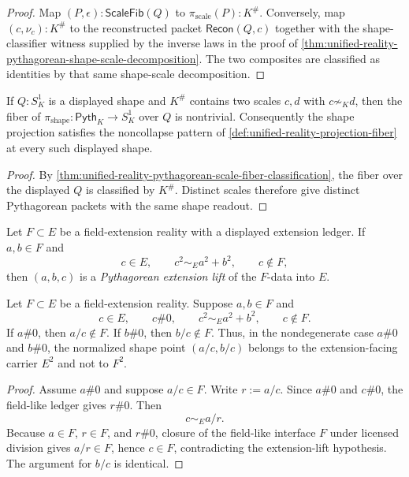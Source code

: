 \begin{proof}
Map $(P,\epsilon):\mathsf{ScaleFib}(Q)$ to
$\pi_{\mathrm{scale}}(P):K^\#$. Conversely, map $(c,\nu_c):K^\#$ to
the reconstructed packet $\mathsf{Recon}(Q,c)$ together with the
shape-classifier witness supplied by the inverse laws in the proof of
\autoref{thm:unified-reality-pythagorean-shape-scale-decomposition}.
The two composites are classified as identities by that same
shape-scale decomposition.
\end{proof}

\begin{corollary}
\label{cor:unified-reality-pythagorean-shape-projection-lossy}
If $Q:S^1_K$ is a displayed shape and $K^\#$ contains two scales $c,d$
with $c\not\sim_K d$, then the fiber of
$\pi_{\mathrm{shape}}:\mathsf{Pyth}_K\to S^1_K$ over $Q$ is
nontrivial. Consequently the shape projection satisfies the noncollapse
pattern of \autoref{def:unified-reality-projection-fiber} at every such
displayed shape.
\end{corollary}

\begin{proof}
By \autoref{thm:unified-reality-pythagorean-scale-fiber-classification},
the fiber over the displayed $Q$ is classified by $K^\#$. Distinct
scales therefore give distinct Pythagorean packets with the same shape
readout.
\end{proof}

\begin{definition}
\label{def:unified-reality-pythagorean-extension-lift}
Let $F\subset E$ be a field-extension reality with a displayed
extension ledger. If $a,b\in F$ and
$$
c\in E,\qquad c^2\sim_Ea^2+b^2,\qquad c\notin F,
$$
then $(a,b,c)$ is a \emph{Pythagorean extension lift} of the
$F$-data into $E$.
\end{definition}

\begin{theorem}
\label{thm:unified-reality-pythagorean-extension-lift-shape}
Let $F\subset E$ be a field-extension reality. Suppose
$a,b\in F$ and
$$
c\in E,\qquad c\#0,\qquad c^2\sim_Ea^2+b^2,\qquad c\notin F.
$$
If $a\#0$, then $a/c\notin F$. If $b\#0$, then $b/c\notin F$.
Thus, in the nondegenerate case $a\#0$ and $b\#0$, the normalized shape
point $(a/c,b/c)$ belongs to the extension-facing carrier $E^2$ and not
to $F^2$.
\end{theorem}

\begin{proof}
Assume $a\#0$ and suppose $a/c\in F$. Write $r:=a/c$. Since $a\#0$
and $c\#0$, the field-like ledger gives $r\#0$. Then
$$
c\sim_E a/r.
$$
Because $a\in F$, $r\in F$, and $r\#0$, closure of the field-like
interface $F$ under licensed division gives $a/r\in F$, hence
$c\in F$, contradicting the extension-lift hypothesis. The argument for
$b/c$ is identical.
\end{proof}


